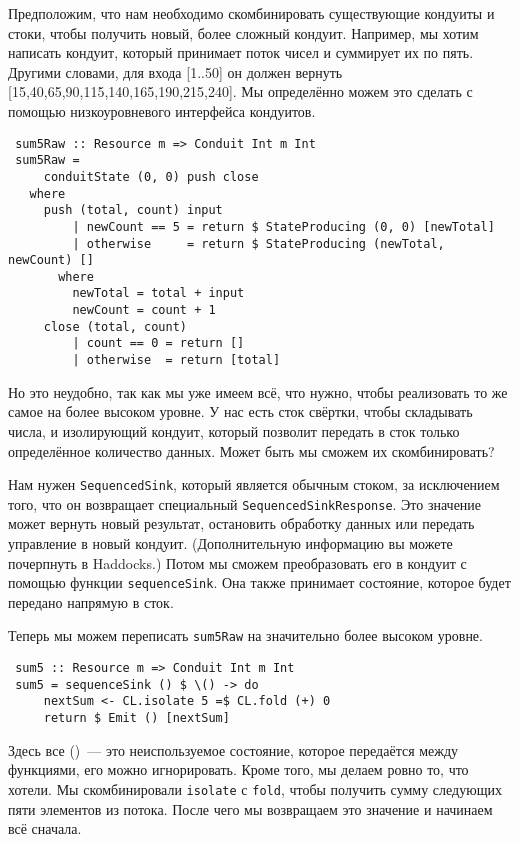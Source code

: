 Предположим, что нам необходимо скомбинировать существующие кондуиты  и  стоки,
чтобы получить новый, более сложный кондуит. Например, мы хотим написать кондуит,
который принимает поток чисел и суммирует их по пять. Другими словами, для входа
[1..50] он должен вернуть [15,40,65,90,115,140,165,190,215,240]. Мы определённо
можем это сделать с помощью низкоуровневого интерфейса кондуитов.
\begin{lstlisting}
 sum5Raw :: Resource m => Conduit Int m Int
 sum5Raw =
     conduitState (0, 0) push close
   where
     push (total, count) input
         | newCount == 5 = return $ StateProducing (0, 0) [newTotal]
         | otherwise     = return $ StateProducing (newTotal, newCount) []
       where
         newTotal = total + input
         newCount = count + 1
     close (total, count)
         | count == 0 = return []
         | otherwise  = return [total]
\end{lstlisting}
Но это неудобно, так как мы уже имеем всё, что нужно, чтобы реализовать то же самое
на более высоком уровне. У нас есть сток свёртки, чтобы складывать числа, и изолирующий
кондуит, который позволит передать в сток только определённое количество данных.
Может быть мы сможем их скомбинировать?

Нам нужен \lstinline'SequencedSink', который является обычным стоком, за исключением
того, что он возвращает специальный \lstinline'SequencedSinkResponse'. Это
значение может вернуть новый результат, остановить обработку данных или передать
управление в новый кондуит. (Дополнительную информацию вы можете почерпнуть
в Haddocks.) Потом мы сможем преобразовать его в кондуит с помощью функции
\lstinline'sequenceSink'. Она также принимает состояние, которое будет
передано напрямую в сток.

Теперь мы можем переписать \lstinline'sum5Raw' на значительно более высоком уровне.
\begin{lstlisting}
 sum5 :: Resource m => Conduit Int m Int
 sum5 = sequenceSink () $ \() -> do
     nextSum <- CL.isolate 5 =$ CL.fold (+) 0
     return $ Emit () [nextSum]
\end{lstlisting}
Здесь все ()~--- это  неиспользуемое состояние, которое передаётся между функциями,
его можно игнорировать.
Кроме того, мы делаем ровно то, что хотели. Мы скомбинировали
\lstinline{isolate} с \lstinline{fold}, чтобы получить сумму следующих пяти
элементов из потока. После чего мы возвращаем это значение и начинаем всё сначала.


